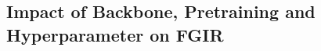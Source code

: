 \documentclass[10pt,twocolumn,letterpaper]{article}
\begin{document}

\subsection{Impact of Backbone, Pretraining and Hyperparameter on FGIR}
\end{document}
